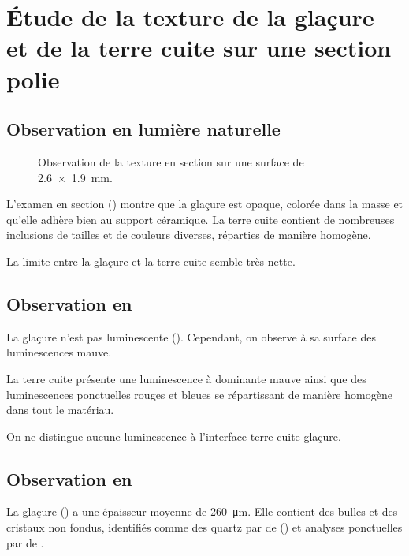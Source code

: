 \section{Étude de la texture de la glaçure et de la terre cuite sur 
         une section polie}

\subsection{Observation en lumière naturelle}
\begin{figure}[htb]
  \begin{minipage}[t]{0.4\textwidth}
  \end{minipage}
  \begin{minipage}[t]{0.4\textwidth}
    \subcaption{\CL \label{texture:6532_CL}}
  \end{minipage}
  \caption{\legendeE 
           Observation de la texture en section sur une surface de 
           \SI{2.6x1.9}{\mm}.}
  \label{texture:6532}
\end{figure}

L'examen en section () montre que la 
glaçure est opaque, colorée dans la masse et qu'elle adhère bien au 
support céramique. La terre cuite contient de nombreuses inclusions 
de tailles et de couleurs diverses, réparties de manière homogène.

La limite entre la glaçure et la terre cuite semble très nette.

\subsection{Observation en \CL}

La glaçure n'est pas luminescente (). 
Cependant, on observe à sa surface des luminescences mauve.

La terre cuite présente une luminescence à dominante mauve ainsi que 
des luminescences ponctuelles rouges et bleues se répartissant de 
manière homogène dans tout le matériau.

On ne distingue aucune luminescence à l'interface terre cuite-glaçure.

\subsection{Observation en \MEB[ie]}
La glaçure () a une épaisseur moyenne de \SI{260}{\um}. Elle contient des bulles et des cristaux non fondus, identifiés comme des quartz par \carto de \RX () et analyses ponctuelles par \spectro de \RX.

